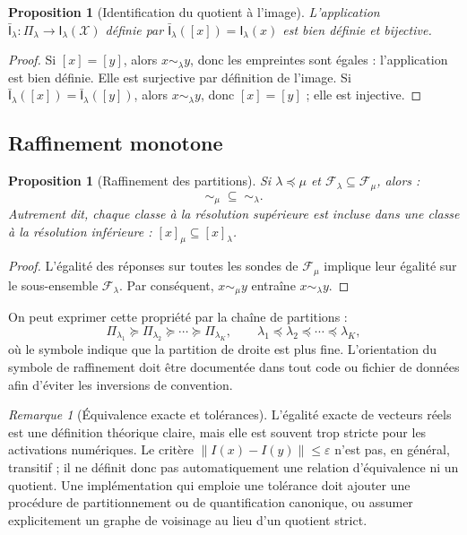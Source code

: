 \documentclass[11pt,a4paper]{article}
\newtheorem{proposition}[definition]{Proposition}
\theoremstyle{remark}
\newtheorem{remark}[definition]{Remarque}
\newcommand{\X}{\mathcal X}
\newcommand{\F}{\mathcal F}
\newcommand{\Emp}{\mathsf I}
\newcommand{\1}{\mathbf 1}
\begin{document}
\begin{proposition}[Identification du quotient à l'image]
L'application $\bar{\Emp}_\lambda:\Pi_\lambda\to\Emp_\lambda(\X)$ définie par $\bar{\Emp}_\lambda([x])=\Emp_\lambda(x)$ est bien définie et bijective.
\end{proposition}
\begin{proof}
Si $[x]=[y]$, alors $x\sim_\lambda y$, donc les empreintes sont égales : l'application est bien définie. Elle est surjective par définition de l'image. Si $\bar{\Emp}_\lambda([x])=\bar{\Emp}_\lambda([y])$, alors $x\sim_\lambda y$, donc $[x]=[y]$ ; elle est injective.
\end{proof}

\subsection{Raffinement monotone}
\begin{proposition}[Raffinement des partitions]
Si $\lambda\preceq\mu$ et $\F_\lambda\subseteq\F_\mu$, alors :
\[
\sim_\mu\;\subseteq\;\sim_\lambda.
\]
Autrement dit, chaque classe à la résolution supérieure est incluse dans une classe à la résolution inférieure : $[x]_\mu\subseteq[x]_\lambda$.
\end{proposition}
\begin{proof}
L'égalité des réponses sur toutes les sondes de $\F_\mu$ implique leur égalité sur le sous-ensemble $\F_\lambda$. Par conséquent, $x\sim_\mu y$ entraîne $x\sim_\lambda y$.
\end{proof}

On peut exprimer cette propriété par la chaîne de partitions :
\[
\Pi_{\lambda_1}\succeq\Pi_{\lambda_2}\succeq\cdots\succeq\Pi_{\lambda_K},
\qquad \lambda_1\preceq\lambda_2\preceq\cdots\preceq\lambda_K,
\]
où le symbole indique que la partition de droite est plus fine. L'orientation du symbole de raffinement doit être documentée dans tout code ou fichier de données afin d'éviter les inversions de convention.

\begin{remark}[Équivalence exacte et tolérances]
L'égalité exacte de vecteurs réels est une définition théorique claire, mais elle est souvent trop stricte pour les activations numériques. Le critère $\|I(x)-I(y)\|\leq\varepsilon$ n'est pas, en général, transitif ; il ne définit donc pas automatiquement une relation d'équivalence ni un quotient. Une implémentation qui emploie une tolérance doit ajouter une procédure de partitionnement ou de quantification canonique, ou assumer explicitement un graphe de voisinage au lieu d'un quotient strict.
\end{remark}
\end{document}

